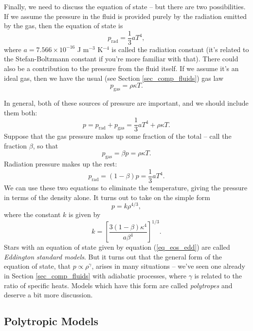 Finally, we need to discuss the equation of state -- but there are two possibilities.  If we assume the pressure in the fluid is provided purely by the radiation emitted by the gas, then the equation of state is
\begin{equation}
p_\text{rad} = \frac{1}{3} aT^4,
\end{equation}
where $a = 7.566 \times 10^{-16}$ J m$^{-3}$ K$^{-4}$ is called the radiation constant (it's related to the Stefan-Boltzmann constant if you're more familiar with that).  There could also be a contribution to the pressure from the fluid itself.  If we assume it's an ideal gas, then we have the usual (see Section \ref{sec_comp_fluids}) gas law
\begin{equation}
p_\text{gas} = \rho \kappa T.
\end{equation}

In general, both of these sources of pressure are important, and we should include them both:
\begin{equation}
p = p_\text{rad} + p_\text{gas} = \frac{1}{3} aT^4 + \rho \kappa T.
\end{equation}
Suppose that the gas pressure makes up some fraction of the total -- call the fraction $\beta$, so that
\[
p_\text{gas} = \beta p = \rho \kappa T.
\]
Radiation pressure makes up the rest:
\[
p_\text{rad} = (1 - \beta) p = \frac{1}{3} aT^4.
\]
We can use these two equations to eliminate the temperature, giving the pressure in terms of the density alone.  It turns out to take on the simple form
\begin{equation}
\label{eq_eos_edd}
p = k \rho^{4/3},
\end{equation}
where the constant $k$ is given by
\[
k = \left[ \frac{3 (1-\beta) \kappa^4}{a \beta^4} \right]^{1/3}.
\]
Stars with an equation of state given by equation (\ref{eq_eos_edd}) are called \emph{Eddington standard models}.  But it turns out that the general form of the equation of state, that $p \propto \rho^\gamma$, arises in many situations -- we've seen one already in Section \ref{sec_comp_fluids} with adiabatic processes, where $\gamma$ is related to the ratio of specific heats.  Models which have this form are called \emph{polytropes} and deserve a bit more discussion.

\subsection{Polytropic Models}

